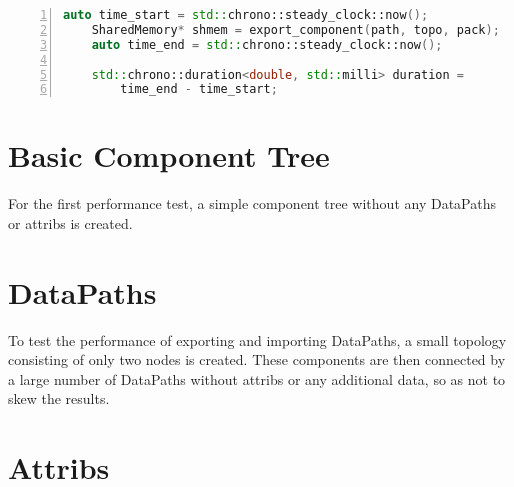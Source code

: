 \begin{lstlisting}[language=c++, numbers=left, caption= Measuring the Execution Time, captionpos=b, label={lst:performance_code}]
    auto time_start = std::chrono::steady_clock::now();
    SharedMemory* shmem = export_component(path, topo, pack);
    auto time_end = std::chrono::steady_clock::now();

    std::chrono::duration<double, std::milli> duration =
        time_end - time_start;
\end{lstlisting}

\section{Basic Component Tree}
For the first performance test, a simple component tree without any DataPaths or attribs is created.

\section{DataPaths}
To test the performance of exporting and importing DataPaths, a small topology consisting of only two nodes is created.
These components are then connected by a large number of DataPaths without attribs or any additional data, so as not to skew the results.

\section{Attribs}